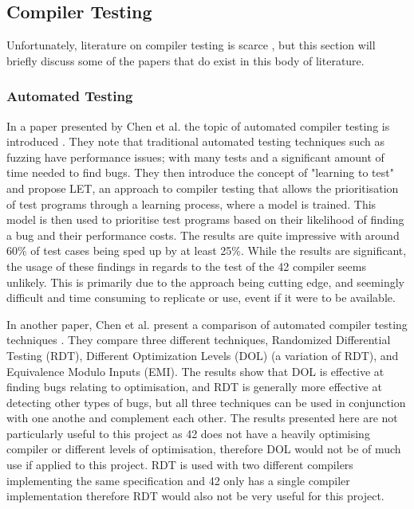 \subsection{Compiler Testing}

Unfortunately, literature on compiler testing is scarce \cite{jai}, but this section will briefly discuss some of the papers that do exist in this body of literature.

\subsubsection{Automated Testing}
In a paper presented by Chen et al. the topic of automated compiler testing is introduced \cite{Chen:2017}. They note that traditional automated testing techniques such as fuzzing have performance issues; with many tests and a significant amount of time needed to find bugs. They then introduce the concept of "learning to test" and propose LET, an approach to compiler testing that allows the prioritisation of test programs through a learning process, where a model is trained. This model is then used to prioritise test programs based on their likelihood of finding a bug and their performance costs. The results are quite impressive with around 60\% of test cases being sped up by at least 25\%. While the results are significant, the usage of these findings in regards to the test of the 42 compiler seems unlikely. This is primarily due to the approach being cutting edge, and seemingly difficult and time consuming to replicate or use, event if it were to be available.

In another paper, Chen et al. present a comparison of automated compiler testing techniques \cite{Chen:2016}. They compare three different techniques, Randomized Differential Testing (RDT), Different Optimization Levels (DOL) (a variation of RDT), and Equivalence Modulo Inputs (EMI). The results show that DOL is effective at finding bugs relating to optimisation, and RDT is generally more effective at detecting other types of bugs, but all three techniques can be used in conjunction with one anothe and complement each other. The results presented here are not particularly useful to this project as 42 does not have a heavily optimising compiler or different levels of optimisation, therefore DOL would not be of much use if applied to this project. RDT is used with two different compilers implementing the same specification and 42 only has a single compiler implementation therefore RDT would also not be very useful for this project.

